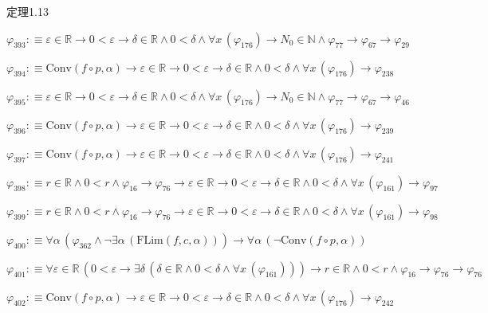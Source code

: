 \begin{fullproof}{定理1.13}
\begin{abbrevlist}
\item $\varphi_{393} :\equiv \varepsilon \in \mathbb{R} \to 0 < \varepsilon \to \delta \in \mathbb{R} \land 0 < \delta \land \forall x\,(\varphi_{176}) \to N_{0} \in \mathbb{N} \land \varphi_{77} \to \varphi_{67} \to \varphi_{29}$
\item $\varphi_{394} :\equiv \mathrm{Conv}(f \circ p,\alpha) \to \varepsilon \in \mathbb{R} \to 0 < \varepsilon \to \delta \in \mathbb{R} \land 0 < \delta \land \forall x\,(\varphi_{176}) \to \varphi_{238}$
\item $\varphi_{395} :\equiv \varepsilon \in \mathbb{R} \to 0 < \varepsilon \to \delta \in \mathbb{R} \land 0 < \delta \land \forall x\,(\varphi_{176}) \to N_{0} \in \mathbb{N} \land \varphi_{77} \to \varphi_{67} \to \varphi_{46}$
\item $\varphi_{396} :\equiv \mathrm{Conv}(f \circ p,\alpha) \to \varepsilon \in \mathbb{R} \to 0 < \varepsilon \to \delta \in \mathbb{R} \land 0 < \delta \land \forall x\,(\varphi_{176}) \to \varphi_{239}$
\item $\varphi_{397} :\equiv \mathrm{Conv}(f \circ p,\alpha) \to \varepsilon \in \mathbb{R} \to 0 < \varepsilon \to \delta \in \mathbb{R} \land 0 < \delta \land \forall x\,(\varphi_{176}) \to \varphi_{241}$
\item $\varphi_{398} :\equiv r \in \mathbb{R} \land 0 < r \land \varphi_{16} \to \varphi_{76} \to \varepsilon \in \mathbb{R} \to 0 < \varepsilon \to \delta \in \mathbb{R} \land 0 < \delta \land \forall x\,(\varphi_{161}) \to \varphi_{97}$
\item $\varphi_{399} :\equiv r \in \mathbb{R} \land 0 < r \land \varphi_{16} \to \varphi_{76} \to \varepsilon \in \mathbb{R} \to 0 < \varepsilon \to \delta \in \mathbb{R} \land 0 < \delta \land \forall x\,(\varphi_{161}) \to \varphi_{98}$
\item $\varphi_{400} :\equiv \forall \alpha\,(\varphi_{362} \land \neg \exists \alpha\,(\mathrm{FLim}(f,c,\alpha))) \to \forall \alpha\,(\neg \mathrm{Conv}(f \circ p,\alpha))$
\item $\varphi_{401} :\equiv \forall \varepsilon \in \mathbb{R}\,(0 < \varepsilon \to \exists \delta\,(\delta \in \mathbb{R} \land 0 < \delta \land \forall x\,(\varphi_{161}))) \to r \in \mathbb{R} \land 0 < r \land \varphi_{16} \to \varphi_{76} \to \varphi_{76}$
\item $\varphi_{402} :\equiv \mathrm{Conv}(f \circ p,\alpha) \to \varepsilon \in \mathbb{R} \to 0 < \varepsilon \to \delta \in \mathbb{R} \land 0 < \delta \land \forall x\,(\varphi_{176}) \to \varphi_{242}$

\end{abbrevlist}
\end{fullproof}
